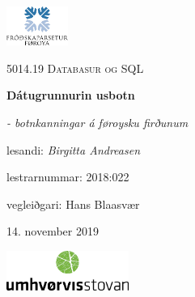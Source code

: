 \begin{titlepage}
\centering
\includegraphics[width=0.15\textwidth]{logosetur.png}\par\vspace{1cm}
{\scshape\Large 5014.19 Databasur og SQL\par}
\vfill
{\huge\bfseries Dátugrunnurin usbotn\par}
{\huge\itshape - botnkanningar á føroysku firðunum\par}
\vfill
{lesandi: \Large\itshape Birgitta Andreasen\par}
{lestrarnummar: 2018:022\par}
{vegleiðgari: Hans Blaasvær\par}
\vspace{1.5cm}
{\large 14. november 2019\par}
\vfill
\includegraphics[width=0.3\textwidth]{logo.png}\par
\end{titlepage}